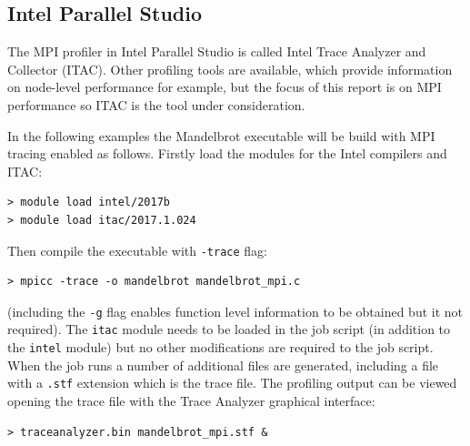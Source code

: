 \documentclass[a4paper,titlepage]{article}
\begin{document}

\subsection{Intel Parallel Studio}

The MPI profiler in Intel Parallel Studio is called Intel Trace Analyzer and Collector (ITAC). Other profiling tools are available, which provide information on node-level performance for example, but the focus of this report is on MPI performance so ITAC is the tool under consideration.

In the following examples the Mandelbrot executable will be build with MPI tracing enabled as follows. Firstly load the modules for the Intel compilers and ITAC: 
\begin{verbatim}
> module load intel/2017b
> module load itac/2017.1.024
\end{verbatim}
Then compile the executable with \texttt{-trace} flag:
\begin{verbatim}
> mpicc -trace -o mandelbrot mandelbrot_mpi.c
\end{verbatim}
(including the \verb+-g+ flag enables function level information to be obtained but it not required). The \texttt{itac} module needs to be loaded in the job script (in addition to the \texttt{intel} module) but no other modifications are required to the job script. When the job runs a number of additional files are generated, including a file with a \texttt{.stf} extension which is the trace file.
The profiling output can be viewed opening the trace file with the Trace Analyzer graphical interface:
\begin{verbatim}
> traceanalyzer.bin mandelbrot_mpi.stf &
\end{verbatim}
\end{document}
